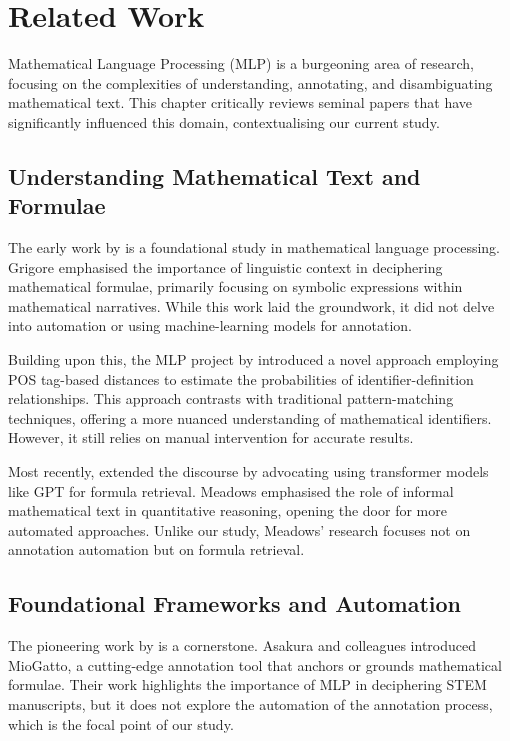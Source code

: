 \chapter{Related Work}\label{chapter:related_work}

Mathematical Language Processing (MLP) is a burgeoning area of research, focusing on the complexities of understanding, annotating, and disambiguating mathematical text. This chapter critically reviews seminal papers that have significantly influenced this domain, contextualising our current study.

\section{Understanding Mathematical Text and Formulae}

The early work by \citet{grigore2009towards} is a foundational study in mathematical language processing. Grigore emphasised the importance of linguistic context in deciphering mathematical formulae, primarily focusing on symbolic expressions within mathematical narratives. While this work laid the groundwork, it did not delve into automation or using machine-learning models for annotation.

Building upon this, the MLP project by \citet{pagael2014mathematical} introduced a novel approach employing \ac{POS} tag-based distances to estimate the probabilities of identifier-definition relationships. This approach contrasts with traditional pattern-matching techniques, offering a more nuanced understanding of mathematical identifiers. However, it still relies on manual intervention for accurate results.

Most recently, \citet{meadows2022survey} extended the discourse by advocating using transformer models like GPT for formula retrieval. Meadows emphasised the role of informal mathematical text in quantitative reasoning, opening the door for more automated approaches. Unlike our study, Meadows' research focuses not on annotation automation but on formula retrieval.

\section{Foundational Frameworks and Automation}

The pioneering work by \citet{asakura2020towards} is a cornerstone. Asakura and colleagues introduced MioGatto, a cutting-edge annotation tool that anchors or grounds mathematical formulae. Their work highlights the importance of MLP in deciphering STEM manuscripts, but it does not explore the automation of the annotation process, which is the focal point of our study.


